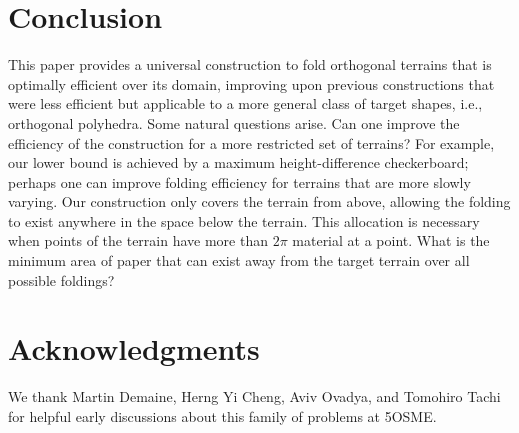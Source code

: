 \documentclass[10pt,twoside]{article}
\begin{document}
\maketitle









\section{Conclusion}

This paper provides a universal construction to fold orthogonal terrains that is
optimally efficient over its domain, improving upon previous constructions that
were less efficient but applicable to a more general class of target shapes,
i.e., orthogonal polyhedra. Some natural questions arise. Can one improve the
efficiency of the construction for a more restricted set of terrains? For
example, our lower bound is achieved by a maximum height-difference
checkerboard; perhaps one can improve folding efficiency for terrains that are
more slowly varying. Our construction only covers the terrain from above,
allowing the folding to exist anywhere in the space below the terrain. This
allocation is necessary when points of the terrain have more than $2\pi$
material at a point. What is the minimum area of paper that can exist away from
the target terrain over all possible foldings?

\section*{Acknowledgments}

We thank Martin Demaine, Herng Yi Cheng, Aviv Ovadya, and Tomohiro Tachi
for helpful early discussions about this family of problems at 5OSME.




\theaffiliations
\end{document}
